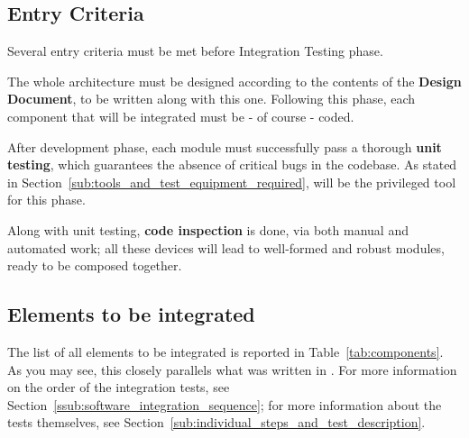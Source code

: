 \documentclass[a4paper, 12pt]{article}
\begin{document}
\subsection{Entry Criteria}
\label{sub:entry_criteria}
Several entry criteria must be met before Integration Testing phase.

The whole architecture must be designed according to the contents of the \textbf{Design Document}, to be written along with this one.
Following this phase, each component that will be integrated must be - of course - coded.

After development phase, each module must successfully pass a thorough \textbf{unit testing}, which guarantees the absence of critical bugs in the codebase. As stated in Section~\ref{sub:tools_and_test_equipment_required},  will be the privileged tool for this phase.

Along with unit testing, \textbf{code inspection} is done, via both manual and automated work; all these devices will lead to well-formed and robust modules, ready to be composed together.

\subsection{Elements to be integrated}
\label{sub:elements_to_be_integrated}

The list of all elements to be integrated is reported in Table~\ref{tab:components}. As you may see, this closely parallels what was written in \cite{bib:dd}. For more information on the order of the integration tests, see Section~\ref{ssub:software_integration_sequence}; for more information about the tests themselves, see Section~\ref{sub:individual_steps_and_test_description}.


\end{document}
